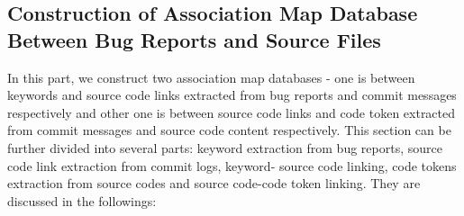 \documentclass{sig-alternate}
\begin{document}
%
%
\subsection{Construction of Association Map Database Between Bug Reports and Source Files}
In this part, we construct two association map databases - one is between keywords and source code links extracted from bug reports and commit messages respectively and other one is between source code links and code token extracted from commit messages and source code content respectively. This section can be further divided into several parts: keyword extraction from bug reports, source code link extraction from commit logs, keyword- source code linking, code tokens extraction from source codes and source code-code token linking. They are discussed in the followings:
\end{document}
